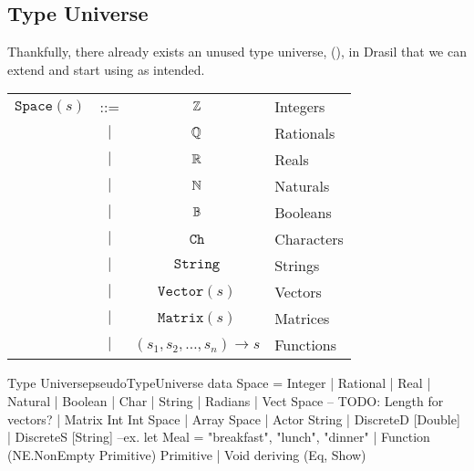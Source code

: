 \subsection{Type Universe}
\label{chap:typed-expr:sec:typing-the-expression-language:subsec:type-universe}

Thankfully, there already exists an unused type universe, \Space{}
(), in Drasil that we can extend and start
using as intended.

\begin{longtable}{ r c c l}
      \(\texttt{Space}(s)\) & ::=       & \(\mathbb{Z}\)                                  & Integers   \\
                            & \(\vert\) & \(\mathbb{Q}\)                                  & Rationals  \\
                            & \(\vert\) & \(\mathbb{R}\)                                  & Reals      \\
                            & \(\vert\) & \(\mathbb{N}\)                                  & Naturals   \\
                            & \(\vert\) & \(\mathbb{B}\)                                  & Booleans   \\
                            & \(\vert\) & \(\texttt{Ch}\)                             & Characters \\
                            & \(\vert\) & \(\texttt{String}\)                         & Strings    \\
                            & \(\vert\) & \(\texttt{Vector}(s)\)                      & Vectors    \\
                            & \(\vert\) & \(\texttt{Matrix}(s)\)                      & Matrices   \\
                            & \(\vert\) & \((s_1, s_2, \ldots{}, s_n) \rightarrow s\) & Functions  \\
\end{longtable}

\begin{pseudohaskell}{Type Universe}{pseudoTypeUniverse}
data Space =
    Integer
  | Rational
  | Real
  | Natural
  | Boolean
  | Char
  | String
  | Radians
  | Vect Space -- TODO: Length for vectors?
  | Matrix Int Int Space
  | Array Space
  | Actor String
  | DiscreteD [Double]
  | DiscreteS [String] --ex. let Meal = {"breakfast", "lunch", "dinner"}
  | Function (NE.NonEmpty Primitive) Primitive
  | Void
  deriving (Eq, Show)
\end{pseudohaskell}


